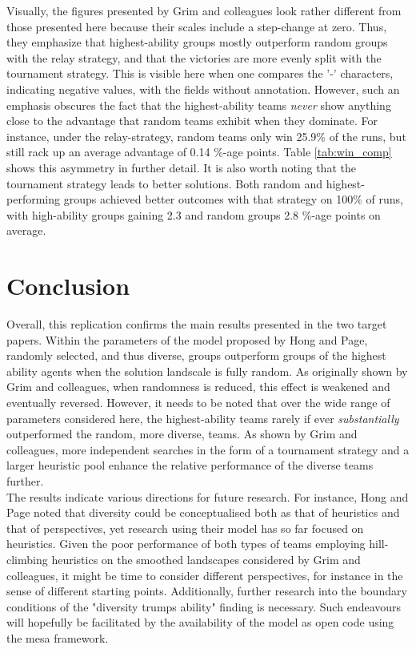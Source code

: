  Visually, the figures presented by Grim and colleagues look rather different from those presented here because their scales include a step-change at zero. Thus, they emphasize that highest-ability groups mostly outperform random groups with the relay strategy, and that the victories are more evenly split with the tournament strategy. This is visible here when one compares the '-' characters, indicating negative values, with the fields without annotation. However, such an emphasis obscures the fact that the highest-ability teams \textit{never} show anything close to the advantage that random teams exhibit when they dominate. For instance, under the relay-strategy, random teams only win 25.9\% of the runs, but still rack up an average advantage of 0.14 \%-age points. Table \ref{tab:win_comp} shows this asymmetry in further detail. It is also worth noting that the tournament strategy leads to better solutions. Both random and highest-performing groups achieved better outcomes with that strategy on 100\% of runs, with high-ability groups gaining 2.3 and random groups 2.8 \%-age points on average.
 

 \section{Conclusion}
 
 Overall, this replication confirms the main results presented in the two target papers. Within the parameters of the model proposed by Hong and Page, randomly selected, and thus diverse, groups outperform groups of the highest ability agents when the solution landscale is fully random. As originally shown by Grim and colleagues, when randomness is reduced, this effect is weakened and eventually reversed. However, it needs to be noted that over the wide range of parameters considered here, the highest-ability teams rarely if ever \textit{substantially} outperformed the random, more diverse, teams. As shown by Grim and colleagues, more independent searches in the form of a tournament strategy and a larger heuristic pool enhance the relative performance of the diverse teams further. \\

 The results indicate various directions for future research. For instance, Hong and Page noted that diversity could be conceptualised both as that of heuristics and that of perspectives, yet research using their model has so far focused on heuristics. Given the poor performance of both types of teams employing hill-climbing heuristics on the smoothed landscapes considered by Grim and colleagues, it might be time to consider different perspectives, for instance in the sense of different starting points. Additionally, further research into the boundary conditions of the "diversity trumps ability" finding is necessary. Such endeavours will hopefully be facilitated by the availability of the model as open code using the mesa framework. 